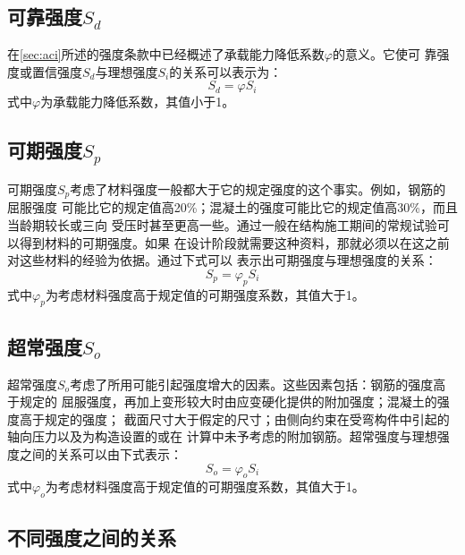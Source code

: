 \documentclass[12pt,a4paper]{book}
\begin{document}
\subsection{可靠强度$S_d$}

在\cref{sec:aci}所述的强度条款中已经概述了承载能力降低系数$\varphi$的意义。它使可
靠强度或置信强度$S_d$与理想强度$S_i$的关系可以表示为：
\begin{equation}
  \label{eq:5} S_d=\varphi S_i
\end{equation}式中$\varphi$为承载能力降低系数，其值小于1。

\subsection{可期强度$S_p$}

可期强度$S_p$考虑了材料强度一般都大于它的规定强度的这个事实。例如，钢筋的屈服强度
可能比它的规定值高20\%；混凝土的强度可能比它的规定值高30\%，而且当龄期较长或三向
受压时甚至更高一些。通过一般在结构施工期间的常规试验可以得到材料的可期强度。如果
在设计阶段就需要这种资料，那就必须以在这之前对这些材料的经验为依据。通过下式可以
表示出可期强度与理想强度的关系：
\begin{equation}
  \label{eq:6} S_p=\varphi_p S_i
\end{equation}式中$\varphi_p$为考虑材料强度高于规定值的可期强度系数，其值大于1。

\subsection{超常强度$S_o$}
\label{sec:s_o}

超常强度$S_o$考虑了所用可能引起强度增大的因素。这些因素包括：钢筋的强度高于规定的
屈服强度，再加上变形较大时由应变硬化提供的附加强度；混凝土的强度高于规定的强度；
截面尺寸大于假定的尺寸；由侧向约束在受弯构件中引起的轴向压力以及为构造设置的或在
计算中未予考虑的附加钢筋。超常强度与理想强度之间的关系可以由下式表示：
\begin{equation}
  \label{eq:7} S_o=\varphi_o S_i
\end{equation}式中$\varphi_o$为考虑材料强度高于规定值的可期强度系数，其值大于1。

\subsection{不同强度之间的关系}
\end{document}
